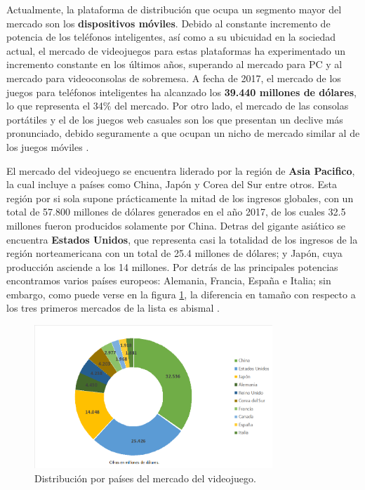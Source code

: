 Actualmente, la plataforma de distribución que ocupa un segmento mayor del mercado son los \textbf{dispositivos móviles}. Debido al constante incremento de potencia de los teléfonos inteligentes, así como a su ubicuidad en la sociedad actual, el mercado de videojuegos para estas plataformas ha experimentado un incremento constante en los últimos años, superando al mercado para PC y al mercado para videoconsolas de sobremesa. A fecha de 2017, el mercado de los juegos para teléfonos inteligentes ha alcanzado los \textbf{39.440 millones de dólares}, lo que representa el 34\% del mercado. Por otro lado, el mercado de las consolas portátiles y el de los juegos web casuales son los que presentan un declive más pronunciado, debido seguramente a que ocupan un nicho de mercado similar al de los juegos móviles \cite{libro_blanco}.

El mercado del videojuego se encuentra liderado por la región de \textbf{Asia Pacifico}, la cual incluye a países como China, Japón y Corea del Sur entre otros. Esta región por si sola supone prácticamente la mitad de los ingresos globales, con un total de 57.800 millones de dólares generados en el año 2017, de los cuales 32.5 millones fueron producidos solamente por China. Detras del gigante asiático se encuentra \textbf{Estados Unidos}, que representa casi la totalidad de los ingresos de la región norteamericana con un total de 25.4 millones de dólares; y Japón, cuya producción asciende a los 14 millones. Por detrás de las principales potencias encontramos varios países europeos: Alemania, Francia, España e Italia; sin embargo, como puede verse en la figura \ref{distribucion-mercado-mundial}, la diferencia en tamaño con respecto a los tres primeros mercados de la lista es abismal \cite{libro_blanco}.

\begin{figure}[h]
    \centering
    \includegraphics[width=0.8\textwidth]{images/estadodelarte/mercado/10-mayores-mercados}
    \caption{Distribución por países del mercado del videojuego.}
    \label{distribucion-mercado-mundial}
\end{figure}

